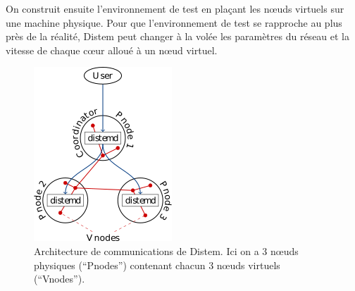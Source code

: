 On construit ensuite l'environnement de test en plaçant les n\oe uds virtuels
sur une machine physique. Pour que l'environnement de test se rapproche au plus
près de la réalité, Distem peut changer à la volée les paramètres du réseau et
la vitesse de chaque c\oe ur alloué à un n\oe ud virtuel.

\begin{figure}
  \centering
  \includegraphics{Pictures/png/Distem_architecture}
  \caption{Architecture de communications de Distem. Ici on a 3 n\oe uds physiques (``Pnodes'') contenant chacun 3 n\oe uds virtuels (``Vnodes'').}
  \label{Distem_archi}
\end{figure}

